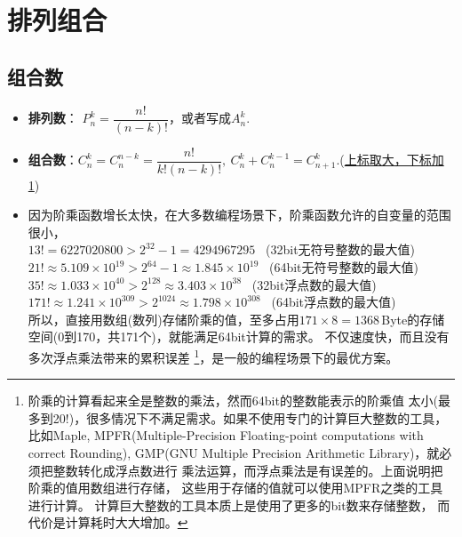 \chapter{排列组合}

\section{组合数}
\begin{itemize}[leftmargin=\inteval{\myitemleftmargin}pt,itemsep=
   \inteval{\myitemitempsep}pt,topsep=\inteval{\myitemtopsep}pt]
   
\item \textbf{排列数}：
$ P_n^k=\dfrac{n!}{(n-k)!} $，或者写成$ A_n^k $. 

\item \textbf{组合数}：$ C_n^k=C_n^{n-k}=\dfrac{n!}{k!(n-k)!},\ 
C_n^k+C_n^{k-1}=C_{n+1}^k $.(\underline{上标取大，下标加1})

\item 因为阶乘函数增长太快，在大多数编程场景下，阶乘函数允许的自变量的范围很小，\\
$ 13! = 6227020800 >2^{32}-1 = 4294967295$ \ (32bit无符号整数的最大值)  \\
$ 21!\approx 5.109\times 10^{19} >2^{64}-1 \approx  1.845\times 10^{19}$ 
\ (64bit无符号整数的最大值)   \\
$ 35!\approx 1.033\times 10^{40} >2^{128} \approx  3.403\times 10^{38}$ 
\ (32bit浮点数的最大值)  \\
$ 171!\approx 1.241\times 10^{309} >2^{1024} \approx  1.798\times 10^{308}$ 
\ (64bit浮点数的最大值)  \\
所以，直接用数组(数列)存储阶乘的值，至多占用$ 171\times 8 = 1368 $\,Byte的存储空间(0到170，共171个)，就能满足64bit计算的需求。
不仅速度快，而且没有多次浮点乘法带来的累积误差
\footnote{阶乘的计算看起来全是整数的乘法，然而64bit的整数能表示的阶乘值
太小(最多到20!)，很多情况下不满足需求。如果不使用专门的计算巨大整数的工具，比如Maple, MPFR(Multiple-Precision Floating-point computations with correct Rounding), GMP(GNU Multiple Precision Arithmetic Library)，就必须把整数转化成浮点数进行
乘法运算，而浮点乘法是有误差的。上面说明把阶乘的值用数组进行存储，
这些用于存储的值就可以使用MPFR之类的工具进行计算。
计算巨大整数的工具本质上是使用了更多的bit数来存储整数，
而代价是计算耗时大大增加。}，是一般的编程场景下的最优方案。


\end{itemize}
